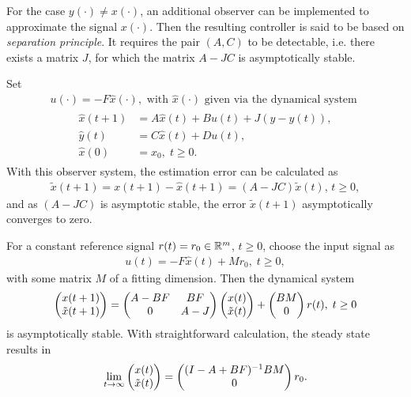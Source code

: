 For the case $y(\cdot) \neq x(\cdot)$, an additional observer can be implemented to approximate the signal $x(\cdot)$. Then the resulting  controller is said to be based on \textit{separation principle}.
It requires the pair $(A,C)$ to be detectable, i.e. there exists a matrix $J$, for which the matrix $A - JC$ is asymptotically stable.

Set 
\begin{align}
u(\cdot)= -F \hat{x}(\cdot), \text{ with } \hat{x}(\cdot) \text{ given via the dynamical system }
\end{align}
\begin{align}
\begin{split}
\hat{x}(t+1) &= A\hat{x}(t) + B u(t) + J (y - \hat{y}(t)), \\
\hat{y}(t) & = C\hat{x}(t) + D u(t), \\
\hat{x}(0)& = x_0, \; t \geq 0. 
\end{split}
\end{align}
With this observer system, the estimation error can be calculated as \begin{align}
\tilde{x}(t+1) = x(t+1) - \hat{x}(t+1) = (A - JC) \tilde{x}(t), \, t \geq 0,
\end{align} and as $(A - JC)$ is asymptotic stable,  the error $\tilde{x}(t+1)$ asymptotically converges to zero. 

For a constant reference signal $r(t) = r_0 \in {\mathbb{R}}^m$, $t \geq 0$, choose the input signal as 
\begin{align}
u(t) = -F\hat{x}(t) + Mr_0, \; t \geq 0,
\end{align}
with some matrix $M$ of a fitting dimension. 
Then the dynamical system 
\begin{align}
\begin{split}
\begin{pmatrix}
x(t+1) \\ \tilde{x}(t+1)
\end{pmatrix} = 
\begin{pmatrix}
A - BF & BF \\ 0 & A-J
\end{pmatrix}
\begin{pmatrix}
x(t) \\ \tilde{x}(t)
\end{pmatrix} + 
\begin{pmatrix}
B M \\ 0
\end{pmatrix}r(t), \; t\geq 0
\end{split}
\end{align}
is asymptotically stable. With straightforward calculation, the steady state results in  
\begin{align}
\lim_{t \to \infty}\begin{pmatrix}
x(t) \\ \tilde{x}(t)
\end{pmatrix} = \begin{pmatrix}
(I - A + BF)^{-1 }BM \\ 0
\end{pmatrix}r_0.
\end{align}

